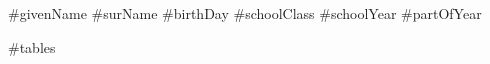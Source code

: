 \documentclass[11pt,a4paper]{article}
\begin{document}
#givenName
#surName
#birthDay
#schoolClass
#schoolYear
#partOfYear

#tables
\end{document}
